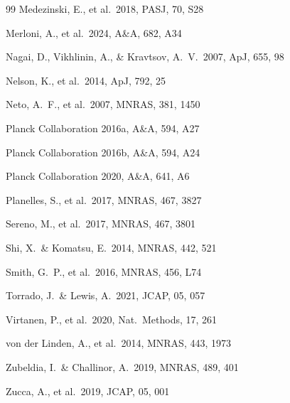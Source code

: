 \documentclass[12pt,a4paper]{article}
\begin{document}
\begin{thebibliography}{99}
 Medezinski, E., et al.\ 2018, PASJ, 70, S28

 Merloni, A., et al.\ 2024, A\&A, 682, A34

 Nagai, D., Vikhlinin, A., \& Kravtsov, A.\ V.\ 2007, ApJ, 655, 98

 Nelson, K., et al.\ 2014, ApJ, 792, 25

 Neto, A.\ F., et al.\ 2007, MNRAS, 381, 1450

 Planck Collaboration 2016a, A\&A, 594, A27

 Planck Collaboration 2016b, A\&A, 594, A24

 Planck Collaboration 2020, A\&A, 641, A6

 Planelles, S., et al.\ 2017, MNRAS, 467, 3827

 Sereno, M., et al.\ 2017, MNRAS, 467, 3801

 Shi, X.\ \& Komatsu, E.\ 2014, MNRAS, 442, 521

 Smith, G.\ P., et al.\ 2016, MNRAS, 456, L74

 Torrado, J.\ \& Lewis, A.\ 2021, JCAP, 05, 057

 Virtanen, P., et al.\ 2020, Nat.\ Methods, 17, 261

 von der Linden, A., et al.\ 2014, MNRAS, 443, 1973

 Zubeldia, I.\ \& Challinor, A.\ 2019, MNRAS, 489, 401

 Zucca, A., et al.\ 2019, JCAP, 05, 001

\end{thebibliography}
\end{document}
